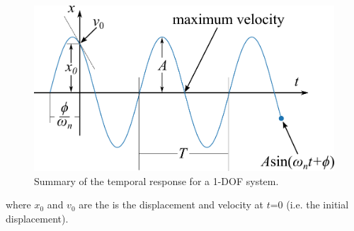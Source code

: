 \documentclass[12pt,letter]{article}
\numberwithin{ex}{section} %
\numberwithin{re}{section} %
\numberwithin{equation}{section}	%
\begin{document}
\begin{figure}[H]
	\centering
	\includegraphics[]{../figures/harmonic_motion_2.png}
	\caption{Summary of the temporal response for a 1-DOF system.}
	\label{fig:Harmonic_Motion_2.png}
\end{figure}
\noindent where $x_0$ and $v_0$ are the is the displacement and velocity at $t$=0 (i.e. the initial displacement). 
\end{document}
